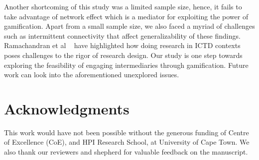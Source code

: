 \documentclass{sig-alternate}
\begin{document}
Another shortcoming of this study was a limited sample size, hence, it fails to take advantage of network effect which is a mediator for exploiting the power of gamification. Apart from a small sample size, we also faced a myriad of challenges such as intermittent connectivity that affect generalizability of these findings. Ramachandran et al ~\cite{ramachandran2010research} have highlighted how doing research in ICTD contexts poses challenges to the rigor of research design. Our study is one step towards exploring the feasibility of engaging intermediaries through gamification. Future work can look into the aforementioned unexplored issues. 

\section{Acknowledgments} 
This work would have not been possible without the generous funding of Centre of Excellence (CoE), and HPI Research School, at University of Cape Town.  We also thank our reviewers and shepherd for valuable feedback on the manuscript.


%

%
%
\end{document}
